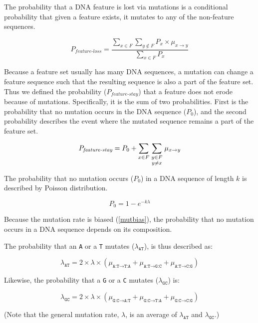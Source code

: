 \documentclass[12pt,a4paper]{article}
\begin{document}
The probability that a DNA feature is lost via mutations is a conditional probability that given a feature exists, it mutates to any of the non-feature sequences. 

\begin{equation}
P_\textit{feature-loss} = \frac{\displaystyle\sum_{x \in F} \sum_{y \notin F} P_x \times \mu_{x\to y}}{\displaystyle\sum_{x \in F} P_x}
\end{equation}

Because a feature set usually has many DNA sequences, a mutation can change a feature sequence such that the resulting sequence is also a part of the feature set. Thus we defined the probability ($P_\textit{feature-stay}$) that a feature does not erode because of mutations. Specifically, it is the sum of two probabilities. First is the probability that no mutation occurs in the DNA sequence ($P_0$), and the second probability describes the event where the mutated sequence remains a part of the feature set.

\begin{equation}
P_\textit{feature-stay} = P_0 + \sum_{x \in F} \sum_{\genfrac{}{}{0pt}{1}{y \in F}{y\neq x}} \mu_{x\to y}
\end{equation}


The probability that no mutation occurs ($P_0$) in a DNA sequence of length $k$ is described by Poisson distribution. 

$$P_0 = 1-e^{-k\lambda}$$

Because the mutation rate is biased (\autoref{mutbias}), the probability that no mutation occurs in a DNA sequence depends on its composition. 

The probability that an \texttt{A} or a \texttt{T} mutates ($\lambda_\texttt{AT}$), is thus described as:

$$\lambda_\texttt{AT} = 2\times\lambda\times(\mu_{\texttt{A:T}\to\texttt{T:A}} + \mu_{\texttt{A:T}\to\texttt{G:C}} + \mu_{\texttt{A:T}\to\texttt{C:G}})$$

Likewise, the probability that a \texttt{G} or a \texttt{C} mutates ($\lambda_\texttt{GC}$) is: 

\vspace{-1ex}

$$\lambda_\texttt{GC} = 2\times\lambda\times(\mu_{\texttt{G:C}\to\texttt{A:T}} + \mu_{\texttt{G:C}\to\texttt{T:A}} + \mu_{\texttt{G:C}\to\texttt{C:G}})$$

(Note that the general mutation rate, $\lambda$, is an average of $\lambda_\texttt{AT}$ and $\lambda_\texttt{GC}$.)
\end{document}
